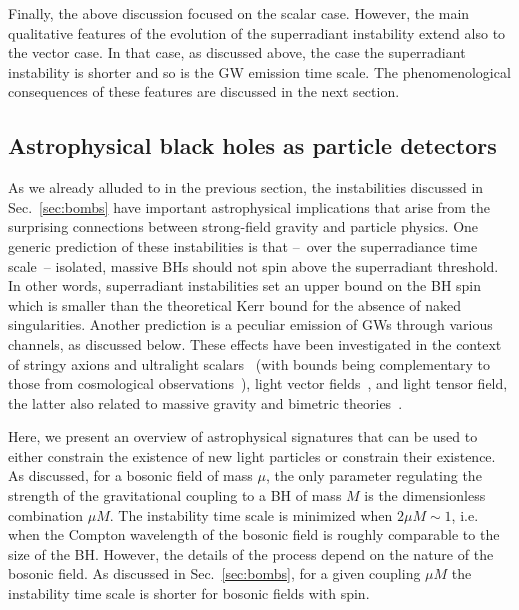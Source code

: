 \documentclass[11pt]{article}
\numberwithin{equation}{section} %
\begin{document}
Finally, the above discussion focused on the scalar case. However, the main qualitative features of the evolution of the 
superradiant instability extend also to the vector case. In that case, as discussed above, the case the superradiant instability is shorter and so is the GW emission time scale. The phenomenological consequences of these features are discussed in the next section.


\subsection{Astrophysical black holes as particle detectors} \label{sec:bounds_mass}
As we already alluded to in the previous section, the instabilities discussed in Sec.~\ref{sec:bombs} have important astrophysical implications that arise from the surprising connections between strong-field gravity and particle physics. 
%
One generic prediction of these instabilities is that --~over the superradiance time scale~-- isolated, massive BHs 
should not spin above the superradiant threshold. In other words, superradiant instabilities set an upper bound on the 
BH spin which is smaller than the theoretical Kerr bound for the absence of naked singularities. Another prediction is a 
peculiar emission of GWs through various channels, as discussed below. These effects have been investigated in the 
context of stringy axions and ultralight 
scalars~\cite{Arvanitaki:2009fg,Arvanitaki:2010sy,Kodama:2011zc,Yoshino:2012kn,Yoshino:2013ofa,Brito:2014wla,Arvanitaki:2014wva,
Arvanitaki:2016qwi,Brito:2017zvb,Brito:2017wnc,Cardoso:2018tly,Stott:2018opm,Davoudiasl:2019nlo} (with bounds being 
complementary to those from cosmological observations~\cite{Bozek:2014uqa,Hlozek:2014lca}), light vector 
fields~\cite{Pani:2012vp,Baryakhtar:2017ngi,Cardoso:2018tly,Davoudiasl:2019nlo}, and light tensor field, the latter 
also related to massive gravity and bimetric theories~\cite{Brito:2013wya,Brito:2020lup}.

Here, we present an overview of astrophysical signatures that can be used to either constrain the existence of new light particles or constrain their existence. As discussed, for a bosonic field of mass $\mu$, the only parameter regulating the strength of the gravitational coupling to a BH of mass $M$ is the dimensionless combination $\mu M$. The instability time scale is minimized when $2\mu M\sim 1$, i.e. when the Compton wavelength of the bosonic field is roughly comparable to the size of the BH. However, the details of the process depend on the nature of the bosonic field. As discussed in Sec.~\ref{sec:bombs}, for a given coupling $\mu M$ the instability time scale is shorter for bosonic fields with spin. %
\end{document}
